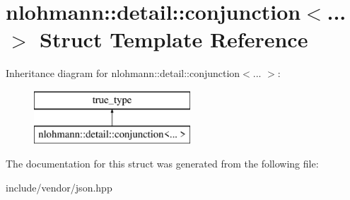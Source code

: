 \hypertarget{structnlohmann_1_1detail_1_1conjunction}{}\section{nlohmann\+:\+:detail\+:\+:conjunction$<$... $>$ Struct Template Reference}
\label{structnlohmann_1_1detail_1_1conjunction}
Inheritance diagram for nlohmann\+:\+:detail\+:\+:conjunction$<$... $>$\+:\begin{figure}[H]
\begin{center}
\leavevmode
\includegraphics[height=2.000000cm]{dd/dde/structnlohmann_1_1detail_1_1conjunction}
\end{center}
\end{figure}


The documentation for this struct was generated from the following file\+:\begin{DoxyCompactItemize}
\item 
include/vendor/json.\+hpp\end{DoxyCompactItemize}
